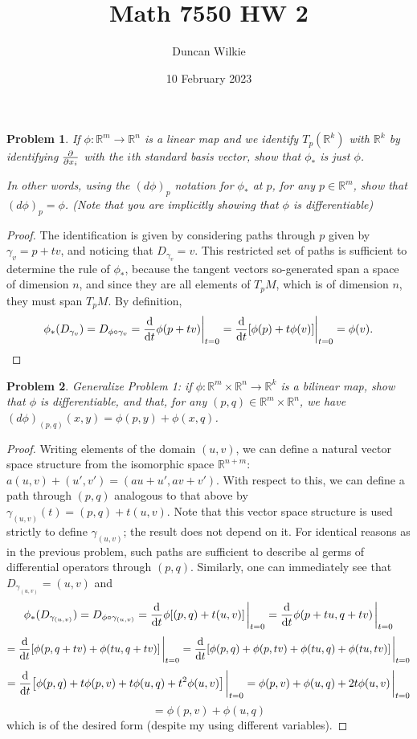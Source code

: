 \documentclass{article}
\title{Math 7550 HW 2}
\author{Duncan Wilkie}
\date{10 February 2023}
\newtheorem{plm}{Problem}
\begin{document}
\maketitle

\begin{plm}
  If $\phi: \mathbb{R}^{m} \to \mathbb{R}^{n}$ is a linear map and we identify $T_{p}(\mathbb{R}^{k})$ with $\mathbb{R}^{k}$
  by identifying $\pdv{x_{i}}$ with the $i$th standard basis vector, show that $\phi_{*}$ is just $\phi$.

  In other words, using the $(d\phi)_{p}$ notation for $\phi_{*}$ at $p$, for any $p \in \mathbb{R}^{m}$, show that $(d\phi)_{p} = \phi$.
  (Note that you are implicitly showing that $\phi$ is differentiable)
\end{plm}

\begin{proof}
  The identification is given by considering paths through $p$ given by $\gamma_{v} = p + tv$, and noticing that $D_{\gamma_{v}} = v$.
  This restricted set of paths is sufficient to determine the rule of $\phi_{*}$,
  because the tangent vectors so-generated span a space of dimension $n$, and since they are all elements of $T_{p}M$,
  which is of dimension $n$, they must span $T_{p}M$.
  By definition,
  \[
    \phi_{*}(D_{\gamma_{v}}) = D_{\phi \circ \gamma_{v}} = \dv{t}\phi(p + tv)\bigg|_{t = 0} = \dv{t}\qty[\phi(p) + t\phi(v)]\bigg|_{t = 0}
    = \phi(v).
  \]
\end{proof}

\begin{plm}
  Generalize Problem 1: if $\phi: \mathbb{R}^{m} \times \mathbb{R}^{n} \to \mathbb{R}^{k}$ is a bilinear map, show that $\phi$ is differentiable,
  and that, for any $(p, q) \in \mathbb{R}^{m} \times \mathbb{R}^{n}$, we have $(d\phi)_{(p,q)}(x,  y) = \phi(p, y) + \phi(x, q)$.
\end{plm}

\begin{proof}
  Writing elements of the domain $(u, v)$, we can define a natural vector space structure from the isomorphic space $\mathbb{R}^{n+m}$:
  $a(u, v) + (u', v') = (au + u', av + v')$.
  With respect to this, we can define a path through $(p, q)$ analogous to that above by $\gamma_{(u, v)}(t) = (p, q) + t(u, v)$.
  Note that this vector space structure is used strictly to define $\gamma_{(u, v)}$; the result does not depend on it.
  For identical reasons as in the previous problem, such paths are sufficient to describe al germs of differential operators through $(p, q)$.
  Similarly, one can immediately see that $D_{\gamma_{(u, v)}} = (u, v)$ and
  \[
    \phi_{*}(D_{\gamma_{(u, v)}}) = D_{\phi \circ \gamma_{(u, v)}} = \dv{t}\phi[(p, q) + t(u, v)]\eval_{t = 0} = \dv{t}\phi(p + tu, q + tv)\eval_{t = 0}
  \]
  \[
    = \dv{t}\qty[\phi(p, q + tv) + \phi(tu, q + tv)]\eval_{t = 0}
    = \dv{t}\qty[\phi(p, q) + \phi(p, tv) + \phi(tu, q) + \phi(tu, tv)]\eval_{t = 0}
  \]
  \[
    = \dv{t}\qty[\phi(p, q) + t\phi(p, v) + t\phi(u, q) + t^{2}\phi(u, v)]\eval_{t = 0}
    = \phi(p, v) + \phi(u, q) + 2t\phi(u, v)\eval_{t = 0}
  \]
  \[
    = \phi(p, v) + \phi(u, q)
  \]
  which is of the desired form (despite my using different variables).
\end{proof}
\end{document}
